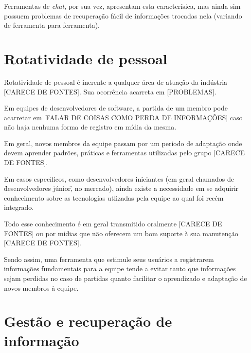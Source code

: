 Ferramentas de \textit{chat}, por sua vez, apresentam esta caracterísica, mas ainda sim possuem problemas de recuperação fácil de informações trocadas nela (variando de ferramenta para ferramenta).

\section{Rotatividade de pessoal}

Rotatividade de pessoal é inerente a qualquer área de atuação da indústria [CARECE DE FONTES].
Sua ocorrência acarreta em [PROBLEMAS].

Em equipes de desenvolvedores de software, a partida de um membro pode acarretar em [FALAR DE COISAS COMO PERDA DE INFORMAÇÕES] caso não haja nenhuma forma de registro em mídia da mesma.

Em geral, novos membros da equipe passam por um período de adaptação onde devem aprender padrões, práticas e ferramentas utilizadas pelo grupo [CARECE DE FONTES].



Em casos específicos, como desenvolvedores iniciantes (em geral chamados de \"desenvolvedores júnior\", no mercado), ainda existe a necessidade em se adquirir conhecimento sobre as tecnologias utlizadas pela equipe ao qual foi recém integrado.

Todo esse conhecimento é em geral transmitido oralmente [CARECE DE FONTES] ou por mídias que não oferecem um bom suporte à sua manutenção [CARECE DE FONTES].

Sendo assim, uma ferramenta que estimule seus usuários a registrarem informações fundamentais para a equipe tende a evitar tanto que informações sejam perdidas no caso de partidas quanto facilitar o aprendizado e adaptação de novos membros à equipe.

\section{Gestão e recuperação de informação}

